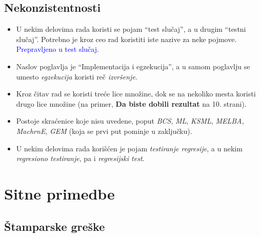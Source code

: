 \documentclass[a4paper]{report}
\newcommand{\odgovor}[1]{\textcolor{blue}{#1}}
\begin{document}
\subsection{Nekonzistentnosti}
\begin{itemize}
\item U nekim delovima rada koristi se pojam ``test slučaj'', a u drugim ``testni slučaj''. Potrebno je kroz ceo rad koristiti iste nazive za neke pojmove. \odgovor{Prepravljeno u test slučaj.}
\item Naslov poglavlja je ``Implementacija i egzekucija'', a u samom poglavlju se umesto {\em{egzekucija}} koristi reč {\em{izvršenje}}.
\item Kroz čitav rad se koristi treće lice množine, dok se na nekoliko mesta koristi drugo lice množine (na primer, {\bf{Da biste dobili rezultat}} na 10. strani).
\item Postoje skraćenice koje nisu uvedene, poput {\em{BCS}}, {\em{ML}}, {\em{KSML}}, {\em{MELBA}, {\em{MachrnE}}}, {\em{GEM}} (koja se prvi put pominje u zaključku).
\item U nekim delovima rada korišćen je pojam {\em{testiranje regresije}}, a u nekim {\em{regresiono testiranje}}, pa i {\em{regresijski test}}.
\end{itemize}


\section{Sitne primedbe}
\subsection{Štamparske greške}
\end{document}
